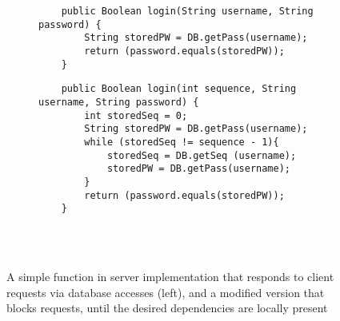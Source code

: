 \begin{figure}[h]
    \begin{subfigure}[t]{0.48\textwidth}
        \centering
	\begin{lstlisting}
	public Boolean login(String username, String password) {
		String storedPW = DB.getPass(username);
		return (password.equals(storedPW));
	}
	\end{lstlisting}
	\label{fig:modified_bb}
    \end{subfigure}
    \quad 
    \begin{subfigure}[t]{0.48\textwidth}
        \centering
	\begin{lstlisting}
	public Boolean login(int sequence, String username, String password) {
		int storedSeq = 0; 
		String storedPW = DB.getPass(username);
		while (storedSeq != sequence - 1){
			storedSeq = DB.getSeq (username);
			storedPW = DB.getPass(username);
		}
		return (password.equals(storedPW));
	}
	\end{lstlisting}
        \label{fig:simple_bb}
    \end{subfigure} 
    \\ \hrulefill \\
\caption{A simple function in server implementation that responds to client
requests via database accesses (left), and a modified version that blocks
requests, until the desired dependencies are locally present}
\label{fig:haskel_code}
\end{figure}




